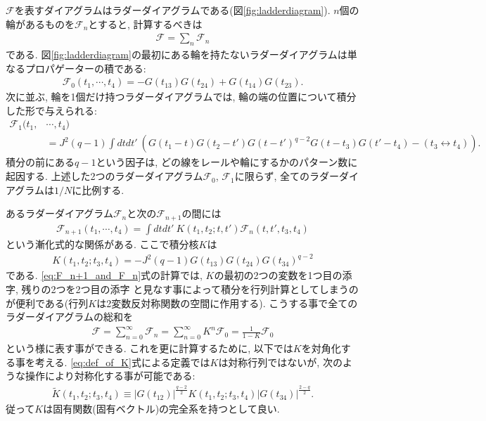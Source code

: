 $\mathcal{F}$を表すダイアグラムはラダーダイアグラムである(図\ref{fig:ladderdiagram}). 
$n$個の輪があるものを$\mathcal{F}_n$とすると, 計算するべきは
\begin{align}
	\mathcal{F} = \sum_n \mathcal{F}_n
\end{align}
である. 
図\ref{fig:ladderdiagram}の最初にある輪を持たないラダーダイアグラムは単なるプロパゲーターの積である:
\begin{align}
	\mathcal{F}_0(t_1, \cdots, t_4) = -G(t_{13})G(t_{24}) + G(t_{14})G(t_{23}).
\end{align}
次に並ぶ, 輪を1個だけ持つラダーダイアグラムでは, 輪の端の位置について積分した形で与えられる:
\begin{align}
	\mathcal{F}_1(t_1, &\cdots, t_4)\nonumber\\
	&= J^2(q - 1)\int dtdt'\ \left(
		G(t_1 - t)G(t_2 - t')G(t - t')^{q-2}G(t - t_3)G(t' - t_4) - (t_3 \leftrightarrow t_4)
	\right).
\end{align}
積分の前にある$q-1$という因子は, どの線をレールや輪にするかのパターン数に起因する. 
上述した2つのラダーダイアグラム$\mathcal{F}_0$, $\mathcal{F}_1$に限らず, 
全てのラダーダイアグラムは$1/N$に比例する. 

あるラダーダイアグラム$\mathcal{F}_n$と次の$\mathcal{F}_{n+1}$の間には
\begin{align}
	\mathcal{F}_{n+1}(t_1, \cdots, t_4)
	= \int dtdt'\ K(t_1, t_2; t, t')\mathcal{F}_n(t, t', t_3, t_4)
	\label{eq:F_n+1_and_F_n}
\end{align}
という漸化式的な関係がある. 
ここで積分核$K$は
\begin{align}
	K(t_1, t_2; t_3, t_4) = -J^2(q-1)G(t_{13})G(t_{24})G(t_{34})^{q-2}
	\label{eq:def_of_K}
\end{align}
である. 
\eqref{eq:F_n+1_and_F_n}式の計算では, $K$の最初の2つの変数を1つ目の添字, 残りの2つを2つ目の添字
と見なす事によって積分を行列計算としてしまうのが便利である(行列$K$は2変数反対称関数の空間に作用する). 
こうする事で全てのラダーダイアグラムの総和を
\begin{align}
	\mathcal{F}
	= \sum_{n=0}^{\infty}\mathcal{F}_n
	= \sum_{n=0}^{\infty}K^n \mathcal{F}_0
	= \frac{1}{1 - K}\mathcal{F}_0
	\label{eq:geometric_series_of_F}
\end{align}
という様に表す事ができる. 
これを更に計算するために, 以下では$K$を対角化する事を考える. 
\eqref{eq:def_of_K}式による定義では$K$は対称行列ではないが, 
次のような操作により対称化する事が可能である:
\begin{align}
	\tilde{K}(t_1, t_2; t_3, t_4) \equiv
	|G(t_{12})|^{\frac{q-2}{2}}K(t_1, t_2; t_3, t_4)|G(t_{34})|^{\frac{2-q}{2}}.
	\label{eq:symmetric_K}
\end{align}
従って$K$は固有関数(固有ベクトル)の完全系を持つとして良い. 

